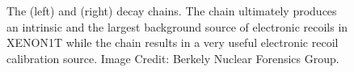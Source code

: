 \begin{figure}[t]
	\centering
	 \hfill
	\caption{The \uranium{} (left) and \thorium{} (right) decay chains.  The \uranium{} chain ultimately produces an intrinsic and the largest background source of electronic recoils in XENON1T while the \thorium{} chain results in a very useful electronic recoil calibration source.  Image Credit: Berkely Nuclear Forensics Group.}
	\label{fig:xe1t_rn_decay_chains}
\end{figure}


\subsubsection{\krypton{}}
\label{sec:xe1t_er_kr85}

